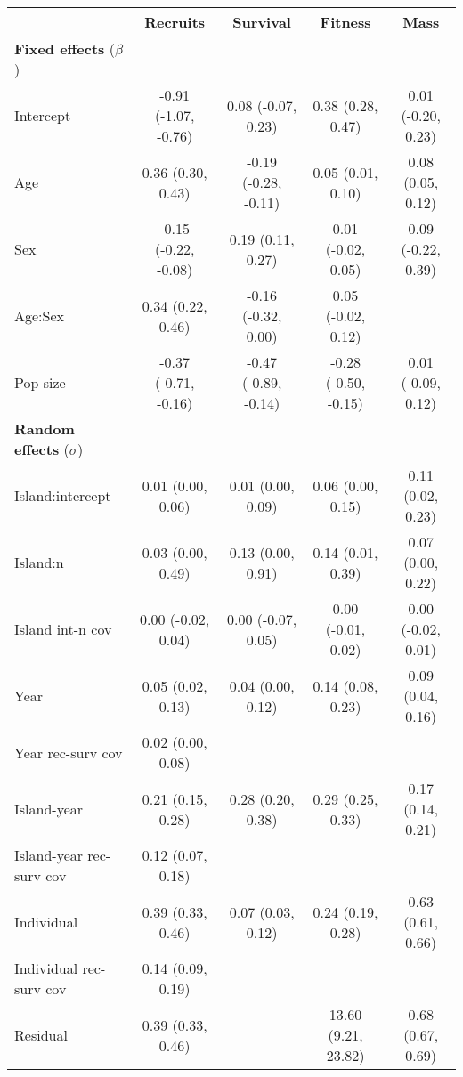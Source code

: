 \begin{tabular}{lcccc}
  \hline
\multicolumn{1}{c}{ } & \multicolumn{1}{c}{\textbf{Recruits}} & \multicolumn{1}{c}{\textbf{Survival}} & \multicolumn{1}{c}{\textbf{Fitness}} & \multicolumn{1}{c}{\textbf{Mass}} \\ 
  \hline
\textbf{Fixed effects} ($\beta$) &  &  &  &  \\ 
  Intercept & -0.91 (-1.07, -0.76) & 0.08 (-0.07, 0.23) & 0.38 (0.28, 0.47) & 0.01 (-0.20, 0.23) \\ 
  Age & 0.36 (0.30, 0.43) & -0.19 (-0.28, -0.11) & 0.05 (0.01, 0.10) & 0.08 (0.05, 0.12) \\ 
  Sex & -0.15 (-0.22, -0.08) & 0.19 (0.11, 0.27) & 0.01 (-0.02, 0.05) & 0.09 (-0.22, 0.39) \\ 
  Age:Sex & 0.34 (0.22, 0.46) & -0.16 (-0.32, 0.00) & 0.05 (-0.02, 0.12) &  \\ 
  Pop size & -0.37 (-0.71, -0.16) & -0.47 (-0.89, -0.14) & -0.28 (-0.50, -0.15) & 0.01 (-0.09, 0.12) \\ 
  \textbf{Random effects} ($\sigma$) &  &  &  &  \\ 
  Island:intercept & 0.01 (0.00, 0.06) & 0.01 (0.00, 0.09) & 0.06 (0.00, 0.15) & 0.11 (0.02, 0.23) \\ 
  Island:n & 0.03 (0.00, 0.49) & 0.13 (0.00, 0.91) & 0.14 (0.01, 0.39) & 0.07 (0.00, 0.22) \\ 
  Island int-n cov & 0.00 (-0.02, 0.04) & 0.00 (-0.07, 0.05) & 0.00 (-0.01, 0.02) & 0.00 (-0.02, 0.01) \\ 
  Year & 0.05 (0.02, 0.13) & 0.04 (0.00, 0.12) & 0.14 (0.08, 0.23) & 0.09 (0.04, 0.16) \\ 
  Year rec-surv cov & 0.02 (0.00, 0.08) &  &  &  \\ 
  Island-year & 0.21 (0.15, 0.28) & 0.28 (0.20, 0.38) & 0.29 (0.25, 0.33) & 0.17 (0.14, 0.21) \\ 
  Island-year rec-surv cov & 0.12 (0.07, 0.18) &  &  &  \\ 
  Individual & 0.39 (0.33, 0.46) & 0.07 (0.03, 0.12) & 0.24 (0.19, 0.28) & 0.63 (0.61, 0.66) \\ 
  Individual rec-surv cov & 0.14 (0.09, 0.19) &  &  &  \\ 
  Residual & 0.39 (0.33, 0.46) &  & 13.60 (9.21, 23.82) & 0.68 (0.67, 0.69) \\ 
   \hline
\end{tabular}
